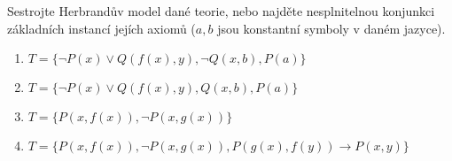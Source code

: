 \documentclass[a4paper,12pt]{article}
\begin{document}


\medskip\begin{problem} Sestrojte Herbrandův model dané teorie, nebo najděte nesplnitelnou konjunkci základních instancí jejích axiomů ($a,b$ jsou konstantní symboly v daném jazyce).
\begin{enumerate}
    \item $T=\{\neg P(x)\vee Q(f(x),y), \neg Q(x,b), P(a)\}$
    \item $T=\{\neg P(x)\vee Q(f(x),y), Q(x,b), P(a)\}$
    \item $T=\{P(x,f(x)),\neg P(x,g(x))\}$
    \item $T=\{P(x,f(x)),\neg P(x,g(x)), P(g(x),f(y)) \to P(x,y)\}$
\end{enumerate}
\end{problem}
\end{document}
